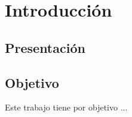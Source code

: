 

\chapter{Introducción}


\section{Presentación} %
\blindtext

\section{Objetivo}

Este trabajo tiene por objetivo ...
\blindtext
